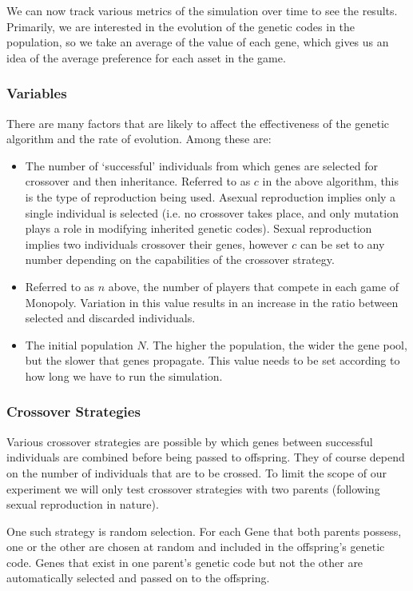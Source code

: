 \documentclass[11pt,a4paper,twocolumn]{scrartcl}
\begin{document}
We can now track various metrics of the simulation over time to see the results. Primarily, we are interested in the evolution of the genetic codes in the population, so we take an average of the value of each gene, which gives us an idea of the average preference for each asset in the game.

\subsubsection{Variables}

There are many factors that are likely to affect the effectiveness of the genetic algorithm and the rate of evolution. Among these are:

\begin{itemize}
\item The number of `successful' individuals from which genes are selected for crossover and then inheritance. Referred to as $c$ in the above algorithm, this is the type of reproduction being used. Asexual reproduction implies only a single individual is selected (i.e. no crossover takes place, and only mutation plays a role in modifying inherited genetic codes). Sexual reproduction implies two individuals crossover their genes, however $c$ can be set to any number depending on the capabilities of the crossover strategy. 
\item Referred to as $n$ above, the number of players that compete in each game of Monopoly. Variation in this value results in an increase in the ratio between selected and discarded individuals.
\item The initial population $N$. The higher the population, the wider the gene pool, but the slower that genes propagate. This value needs to be set according to how long we have to run the simulation.
\end{itemize}


\subsubsection{Crossover Strategies}

Various crossover strategies are possible by which genes between successful individuals are combined before being passed to offspring. They of course depend on the number of individuals that are to be crossed. To limit the scope of our experiment we will only test crossover strategies with two parents (following sexual reproduction in nature).

One such strategy is random selection. For each Gene that both parents possess, one or the other are chosen at random and included in the offspring's genetic code. Genes that exist in one parent's genetic code but not the other are automatically selected and passed on to the offspring.
\end{document}
